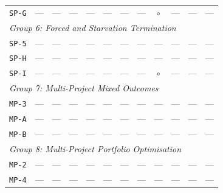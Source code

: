 \documentclass[12pt, a4paper]{article}
\begin{document}
\begin{longtable}{lccccccccccc}
\texttt{SP-G} & {\color{gray}---} & {\color{gray}---} & {\color{gray}---} & {\color{gray}---} & {\color{gray}---} & {\color{gray}---} & {\color{gray}---} & {\color{gray}$\circ$} & {\color{gray}---} & {\color{gray}---} & {\color{gray}---} \\
\multicolumn{12}{l}{\small\textit{Group 6: Forced and Starvation Termination}} \\
\texttt{SP-5} & {\color{gray}---} & {\color{gray}---} & {\color{gray}---} & {\color{gray}---} & {\color{gray}---} & {\color{gray}---} & {\color{gray}---} & {\color{gray}---} & {\color{gray}---} & {\color{gray}---} & {\color{gray}---} \\
\texttt{SP-H} & {\color{gray}---} & {\color{gray}---} & {\color{gray}---} & {\color{gray}---} & {\color{gray}---} & {\color{gray}---} & {\color{gray}---} & {\color{gray}---} & {\color{gray}---} & {\color{gray}---} & {\color{gray}---} \\
\texttt{SP-I} & {\color{gray}---} & {\color{gray}---} & {\color{gray}---} & {\color{gray}---} & {\color{gray}---} & {\color{gray}---} & {\color{gray}---} & {\color{gray}$\circ$} & {\color{gray}---} & {\color{gray}---} & {\color{gray}---} \\
\multicolumn{12}{l}{\small\textit{Group 7: Multi-Project Mixed Outcomes}} \\
\texttt{MP-3} & {\color{gray}---} & {\color{gray}---} & {\color{gray}---} & {\color{gray}---} & {\color{gray}---} & {\color{gray}---} & {\color{gray}---} & {\color{gray}---} & {\color{gray}---} & {\color{gray}---} & {\color{gray}---} \\
\texttt{MP-A} & {\color{gray}---} & {\color{gray}---} & {\color{gray}---} & {\color{gray}---} & {\color{gray}---} & {\color{gray}---} & {\color{gray}---} & {\color{gray}---} & {\color{gray}---} & {\color{gray}---} & {\color{gray}---} \\
\texttt{MP-B} & {\color{gray}---} & {\color{gray}---} & {\color{gray}---} & {\color{gray}---} & {\color{gray}---} & {\color{gray}---} & {\color{gray}---} & {\color{gray}---} & {\color{gray}---} & {\color{gray}---} & {\color{gray}---} \\
\multicolumn{12}{l}{\small\textit{Group 8: Multi-Project Portfolio Optimisation}} \\
\texttt{MP-2} & {\color{gray}---} & {\color{gray}---} & {\color{gray}---} & {\color{gray}---} & {\color{gray}---} & {\color{gray}---} & {\color{gray}---} & {\color{gray}---} & {\color{gray}---} & {\color{gray}---} & {\color{gray}---} \\
\texttt{MP-4} & {\color{gray}---} & {\color{gray}---} & {\color{gray}---} & {\color{gray}---} & {\color{gray}---} & {\color{gray}---} & {\color{gray}---} & {\color{gray}---} & {\color{gray}---} & {\color{gray}---} & {\color{gray}---} \\

\end{longtable}
\end{document}
